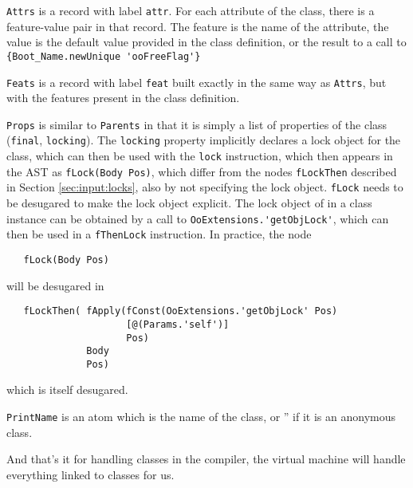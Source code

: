 \documentclass[a4paper]{memoir}
\begin{document}
\lstinline!Attrs! is a record with label \lstinline!attr!.
For each attribute of the class, there is a feature-value pair in that record.
The feature is the name of the attribute, the value is the default value
provided in the class definition, or the result to a call to
\lstinline!{Boot_Name.newUnique 'ooFreeFlag'}!

\lstinline!Feats! is a record with label \lstinline!feat! built exactly in the
same way as \lstinline!Attrs!, but with the features present in the class
definition.

\lstinline!Props! is similar to \lstinline!Parents! in that it is simply a list of properties of the class (\lstinline!final!,
\lstinline!locking!). The \lstinline!locking! property implicitly declares a
lock object for the class, which can then be used with the \lstinline!lock!
instruction, which then appears in the AST as \lstinline!fLock(Body Pos)!, which
differ from the nodes \lstinline!fLockThen! described in Section
\ref{sec:input:locks}, also by not specifying the lock object. \lstinline!fLock!
needs to be desugared to make the lock object explicit. The lock object of in a
class instance can be obtained by a call to
\lstinline!OoExtensions.'getObjLock'!, which can then be used in a
\lstinline!fThenLock! instruction. In practice, the node
\label{desugar:classes:lock}
\begin{lstlisting}
   fLock(Body Pos)
\end{lstlisting}

will be desugared in 

\begin{lstlisting}
   fLockThen( fApply(fConst(OoExtensions.'getObjLock' Pos) 
                     [@(Params.'self')] 
                     Pos)
              Body 
              Pos)  
\end{lstlisting}
which is itself desugared.

\lstinline!PrintName! is an atom which is the name of the class, or '' if it is
an anonymous class.

And that's it for handling classes in the compiler, the virtual machine will
handle everything linked to classes for us.
\end{document}
